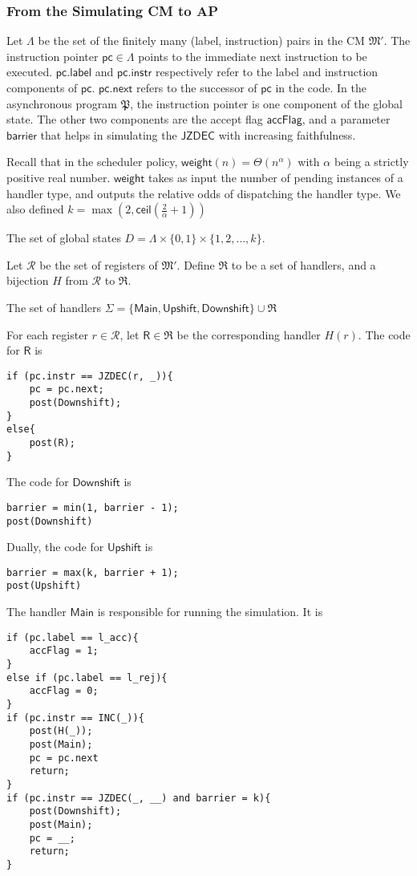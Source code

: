 \documentclass{article}
\theoremstyle{remark}
\newcommand{\program}{\mathfrak{P}}
\newcommand{\machine}{\mathfrak{M}}
\newcommand{\weight}{\mathsf{weight}}
\newcommand{\jzdec}{\mathsf{JZDEC}}
\newcommand{\pc}{\mathsf{pc}}
\newcommand{\lab}{\mathsf{label}}
\newcommand{\instr}{\mathsf{instr}}
\newcommand{\nxt}{\mathsf{next}}
\newcommand{\main}{\mathsf{Main}}
\newcommand{\accflag}{\mathsf{accFlag}}
\newcommand{\barrier}{\mathsf{barrier}}
\newcommand{\upshift}{\mathsf{Upshift}}
\newcommand{\downshift}{\mathsf{Downshift}}
\begin{document}
\subsubsection{From the Simulating CM to AP}
Let $\Lambda$ be the set of the finitely many (label, instruction) pairs in the CM $\machine'$. The instruction pointer $\pc \in \Lambda$ points to the immediate next instruction to be executed. $\pc.\lab$ and $\pc.\instr$ respectively refer to the label and instruction components of $\pc$. $\pc.\nxt$ refers to the successor of $\pc$ in the code. In the asynchronous program $\program$, the instruction pointer is one component of the global state. The other two components are the accept flag $\accflag$, and a parameter $\barrier$ that helps in simulating the $\jzdec$ with increasing faithfulness. 

Recall that in the scheduler policy, $\weight(n) = \Theta(n^\alpha)$ with $\alpha$ being a strictly positive real number. $\weight$ takes as input the number of pending instances of a handler type, and outputs the relative odds of dispatching the handler type. We also defined $k = \max\left(2, \mathsf{ceil}\left(\frac{2}{\alpha}+1\right)\right)$

The set of global states $D = \Lambda \times \{0, 1\} \times \{1, 2, \dots, k\}$. 

Let $\mathcal{R}$ be the set of registers of $\machine'$. Define $\mathfrak{R}$ to be a set of handlers, and a bijection $H$ from $\mathcal{R}$ to $\mathfrak{R}$. 

The set of handlers $\Sigma = \{\main, \upshift, \downshift\} \cup \mathfrak{R}$

For each register $r \in \mathcal{R}$, let $\mathsf{R} \in \mathfrak{R}$ be the corresponding handler $H(r)$. The code for $\mathsf{R}$ is
\begin{lstlisting}
if (pc.instr == JZDEC(r, _)){
	pc = pc.next;
	post(Downshift);
}
else{
	post(R);
}
\end{lstlisting}

The code for $\downshift$ is
\begin{lstlisting}
barrier = min(1, barrier - 1);
post(Downshift)
\end{lstlisting}

Dually, the code for $\upshift$ is
\begin{lstlisting}
barrier = max(k, barrier + 1);
post(Upshift)
\end{lstlisting}

The handler $\main$ is responsible for running the simulation. It is 
\begin{lstlisting}
if (pc.label == l_acc){
	accFlag = 1;
}
else if (pc.label == l_rej){
	accFlag = 0;
}
if (pc.instr == INC(_)){
	post(H(_));
	post(Main);
	pc = pc.next
	return;
}
if (pc.instr == JZDEC(_, __) and barrier = k){
	post(Downshift);
	post(Main);
	pc = __;
	return;
}
\end{lstlisting}
\end{document}
